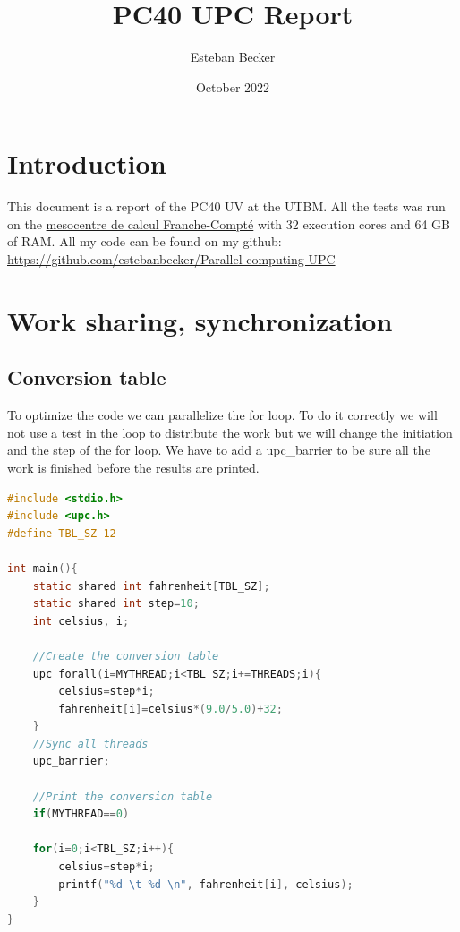 \documentclass{report}
\title{PC40 UPC Report}
\author{Esteban Becker}
\date{October 2022}
\begin{document}
\maketitle

\tableofcontents

\chapter{Introduction}

This document is a report of the PC40 UV at the UTBM. \newline
All the tests was run on the \href{https://www.univ-fcomte.fr/informatique-calcul/mesocentre-de-calcul}{mesocentre de calcul Franche-Compté} with 32 execution cores and 64 GB of RAM.\newline
All my code can be found on my github: \href{https://github.com/estebanbecker/Parallel-computing-UPC}{https://github.com/estebanbecker/Parallel-computing-UPC}

\chapter{Work sharing, synchronization}

\section{Conversion table}

To optimize the code we can parallelize the for loop. To do it correctly we will not use a test in the loop to distribute the work but we will change the initiation and the step of the for loop.\newline
We have to add a upc\_barrier to be sure all the work is finished before the results are printed.

\begin{lstlisting}[language=C]
#include <stdio.h>
#include <upc.h>
#define TBL_SZ 12

int main(){
    static shared int fahrenheit[TBL_SZ];
    static shared int step=10; 
    int celsius, i;

    //Create the conversion table
    upc_forall(i=MYTHREAD;i<TBL_SZ;i+=THREADS;i){
        celsius=step*i;
        fahrenheit[i]=celsius*(9.0/5.0)+32;
    }
    //Sync all threads
    upc_barrier;

    //Print the conversion table
    if(MYTHREAD==0)

    for(i=0;i<TBL_SZ;i++){
        celsius=step*i;
        printf("%d \t %d \n", fahrenheit[i], celsius);
    }
}

\end{lstlisting}
\end{document}
